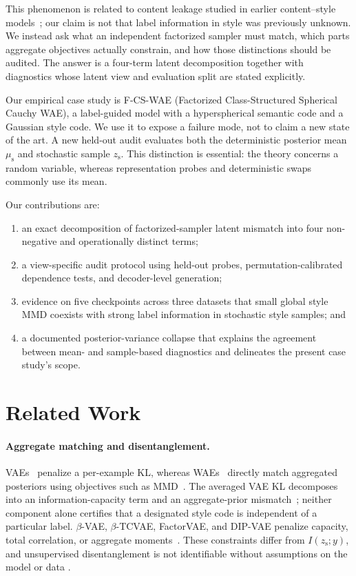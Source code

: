 \documentclass{article}
\newcommand{\ours}{F-CS-WAE}
\newcommand{\zs}{z_{\mathrm{s}}}
\newcommand{\mus}{\mu_{\mathrm{s}}}
\begin{document}
This phenomenon is related to content leakage studied in earlier
content--style models~\citep{ridgeway2018leakage}; our claim is not that label
information in style was previously unknown.  We instead ask what an
independent factorized sampler must match, which parts aggregate objectives
actually constrain, and how those distinctions should be audited.  The
answer is a four-term latent decomposition together with diagnostics whose
latent view and evaluation split are stated explicitly.

Our empirical case study is \ours{} (Factorized Class-Structured Spherical
Cauchy WAE), a label-guided model with a hyperspherical semantic code and a
Gaussian style code.  We use it to expose a failure mode, not to claim a new
state of the art.  A new held-out audit evaluates both the deterministic
posterior mean $\mus$ and stochastic sample $\zs$.  This distinction is
essential: the theory concerns a random variable, whereas representation
probes and deterministic swaps commonly use its mean.

Our contributions are:
\begin{enumerate}
    \item an exact decomposition of factorized-sampler latent mismatch into
    four non-negative and operationally distinct terms;
    \item a view-specific audit protocol using held-out probes,
    permutation-calibrated dependence tests, and decoder-level generation;
    \item evidence on five checkpoints across three datasets that small
    global style MMD coexists with strong label information in stochastic
    style samples; and
    \item a documented posterior-variance collapse that explains the
    agreement between mean- and sample-based diagnostics and delineates the
    present case study's scope.
\end{enumerate}

\section{Related Work}
\label{sec:related}

\paragraph{Aggregate matching and disentanglement.}
VAEs~\citep{kingma2013autoencoding} penalize a per-example KL, whereas
WAEs~\citep{tolstikhin2017wasserstein} directly match aggregated posteriors
using objectives such as MMD~\citep{gretton2012kernel}.  The averaged VAE KL
decomposes into an information-capacity term and an aggregate-prior
mismatch~\citep{hoffman2016elbo}; neither component alone certifies that a
designated style code is independent of a particular label.  $\beta$-VAE,
$\beta$-TCVAE, FactorVAE, and DIP-VAE penalize capacity, total correlation, or
aggregate moments~\citep{higgins2017beta,chen2018isolating,kim2018disentangling,kumar2018dipvae}.
These constraints differ from $I(\zs;y)$, and unsupervised disentanglement is
not identifiable without assumptions on the model or data
\citep{locatello2019challenging}.
\end{document}
